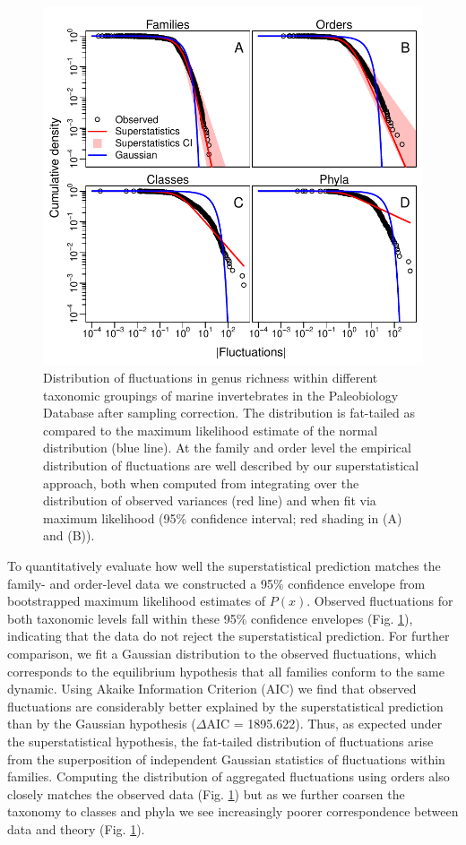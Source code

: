 \documentclass[12pt]{article}
\let\citep=\cite
\begin{document}
\begin{figure}[!h]
  \centering
  \includegraphics[scale=1]{../../fig_Px.pdf} 
  \caption[Clade-level distribution of richness
  fluctuations]{Distribution of fluctuations in genus richness within
    different taxonomic groupings of marine invertebrates in the
    Paleobiology Database \citep{alroy08} after sampling
    correction. The distribution is fat-tailed as compared to the
    maximum likelihood estimate of the normal distribution (blue
    line).  At the family and order level the empirical distribution
    of fluctuations are well described by our superstatistical
    approach, both when computed from integrating over the
    distribution of observed variances (red line) and when fit via
    maximum likelihood (95\% confidence interval; red shading in
    (A) and (B)).}
  \label{fig:Px}
\end{figure}

To quantitatively evaluate how well the superstatistical prediction
matches the family- and order-level data we constructed a 95\%
confidence envelope from bootstrapped maximum likelihood estimates of
$P(x)$. Observed fluctuations for both taxonomic levels fall within
these 95\% confidence envelopes (Fig. \ref{fig:Px}), indicating that
the data do not reject the superstatistical prediction. For further
comparison, we fit a Gaussian distribution to the observed
fluctuations, which corresponds to the equilibrium hypothesis that all
families conform to the same dynamic. Using Akaike Information
Criterion (AIC) we find that observed fluctuations are considerably
better explained by the superstatistical prediction than by the
Gaussian hypothesis ({\small $\Delta$}AIC = 1895.622). Thus, as
expected under the superstatistical hypothesis, the fat-tailed
distribution of fluctuations arise from the superposition of
independent Gaussian statistics of fluctuations within families.
Computing the distribution of aggregated fluctuations using orders
also closely matches the observed data (Fig. \ref{fig:Px}) but as we
further coarsen the taxonomy to classes and phyla we see increasingly
poorer correspondence between data and theory (Fig. \ref{fig:Px}).
\end{document}
